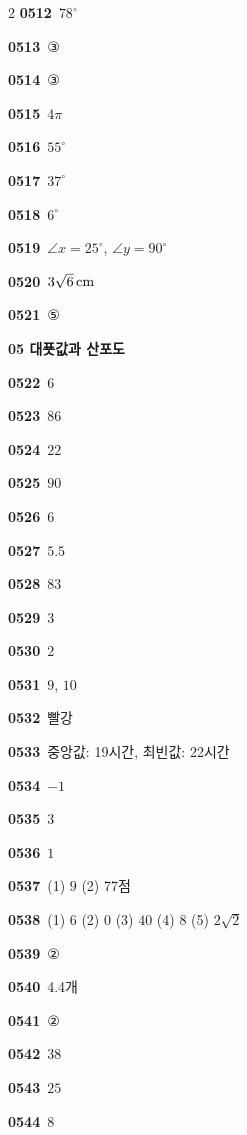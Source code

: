\documentclass[10pt,a4paper]{article}
\begin{document}
\begin{multicols}{2}
\noindent\textbf{0512}\ $78^\circ$\par
\noindent\textbf{0513}\ ③\par
\noindent\textbf{0514}\ ③\par
\noindent\textbf{0515}\ $4\pi$\par
\noindent\textbf{0516}\ $55^\circ$\par
\noindent\textbf{0517}\ $37^\circ$\par
\noindent\textbf{0518}\ $6^\circ$\par
\noindent\textbf{0519}\ $\angle x=25^\circ$, $\angle y=90^\circ$\par
\noindent\textbf{0520}\ $3\sqrt{6}\mkern3mu \mathrm{cm}$\par
\noindent\textbf{0521}\ ⑤\par
\noindent\textbf{05 대푯값과 산포도}\par\smallskip
\noindent\textbf{0522}\ $6$\par
\noindent\textbf{0523}\ $86$\par
\noindent\textbf{0524}\ $22$\par
\noindent\textbf{0525}\ $90$\par
\noindent\textbf{0526}\ $6$\par
\noindent\textbf{0527}\ $5.5$\par
\noindent\textbf{0528}\ $83$\par
\noindent\textbf{0529}\ $3$\par
\noindent\textbf{0530}\ $2$\par
\noindent\textbf{0531}\ $9$, $10$\par
\noindent\textbf{0532}\ 빨강\par
\noindent\textbf{0533}\ 중앙값: 19시간, 최빈값: 22시간\par
\noindent\textbf{0534}\ $-1$\par
\noindent\textbf{0535}\ $3$\par
\noindent\textbf{0536}\ $1$\par
\noindent\textbf{0537}\ (1) $9$ (2) 77점\par
\noindent\textbf{0538}\ (1) $6$ (2) $0$ (3) $40$ (4) $8$ (5) $2\sqrt{2}$\par
\noindent\textbf{0539}\ ②\par
\noindent\textbf{0540}\ 4.4개\par
\noindent\textbf{0541}\ ②\par
\noindent\textbf{0542}\ $38$\par
\noindent\textbf{0543}\ $25$\par
\noindent\textbf{0544}\ $8$\par

\end{multicols}
\end{document}
